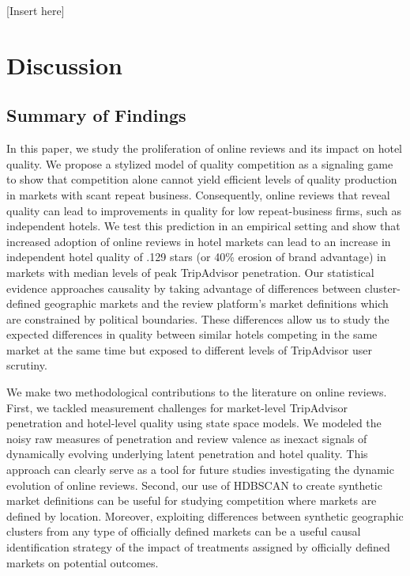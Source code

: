 \documentclass[mksc,blindrev]{informs3} %
\begin{document}
[Insert  here]

\section{Discussion} \label{sec:discussion}

\subsection{Summary of Findings}

In this paper, we study the proliferation of online reviews and its impact on hotel quality. We propose a stylized model of quality competition as a signaling game to show that competition alone cannot yield efficient levels of quality production in markets with scant repeat business. Consequently, online reviews that reveal quality can lead to improvements in quality for low repeat-business firms, such as independent hotels. We test this prediction in an empirical setting and show that increased adoption of online reviews in hotel markets can lead to an increase in independent hotel quality of .129 stars (or 40\% erosion of brand advantage) in markets with median levels of peak TripAdvisor penetration. Our statistical evidence approaches causality by taking advantage of differences between cluster-defined geographic markets and the review platform's market definitions which are constrained by political boundaries. These differences allow us to study the expected differences in quality between similar hotels competing in the same market at the same time but exposed to different levels of TripAdvisor user scrutiny.

We make two methodological contributions to the literature on online reviews. First, we tackled measurement challenges for market-level TripAdvisor penetration and hotel-level quality using state space models. We modeled the noisy raw measures of penetration and review valence as inexact signals of dynamically evolving underlying latent penetration and hotel quality. This approach can clearly serve as a tool for future studies investigating the dynamic evolution of online reviews. Second, our use of HDBSCAN to create synthetic market definitions can be useful for studying competition where markets are defined by location. Moreover, exploiting differences between synthetic geographic clusters from any type of officially defined markets can be a useful causal identification strategy of the impact of treatments assigned by officially defined markets on potential outcomes.
\end{document}
